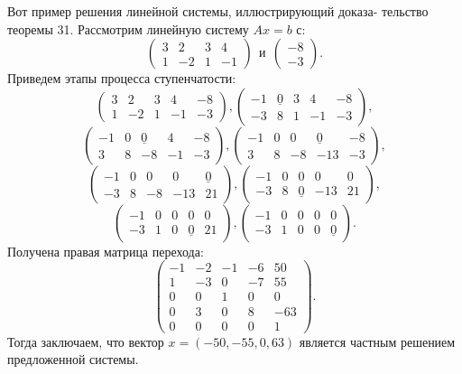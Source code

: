 	Вот пример решения линейной системы, иллюстрирующий доказа-\linebreak
	тельство теоремы 31. Рассмотрим линейную систему $Ax = b$ с:\linebreak
	$$\begin{pmatrix} 3 & 2 & 3 & 4 \\ 1 & -2 & 1 & -1 \end{pmatrix} \ \ \text{и} \ \ \begin{pmatrix} -8 \\ -3 \end{pmatrix}.$$
	Приведем этапы процесса ступенчатости:
	$$\begin{pmatrix} 3 & 2 & 3 & 4 & -8 \\ 1 & -2 & 1 & -1 & -3 \end{pmatrix}, \begin{pmatrix} -1 & \underline{0} & 3 & 4 & -8 \\ -3 & 8 & 1 & -1 & -3 \end{pmatrix},$$
	$$\begin{pmatrix} -1 & 0 & \underline{0} & 4 & -8 \\ 3 & 8 & -8 & -1 & -3 \end{pmatrix}, \begin{pmatrix} -1 & 0 & 0 & \underline{0} & -8 \\ 3 & 8 & -8 & -13 & -3 \end{pmatrix},$$
	$$\begin{pmatrix} -1 & 0 & 0 & 0 & \underline{0} \\ -3 & 8 & -8 & -13 & 21 \end{pmatrix}, \begin{pmatrix} -1 & 0 & 0 & 0 & 0 \\ -3 & 8 & \underline{0} & -13 & 21 \end{pmatrix},$$
	$$\begin{pmatrix} -1 & 0 & 0 & 0 & 0 \\ -3 & 1 & 0 & \underline{0} & 21 \end{pmatrix}, \begin{pmatrix} -1 & 0 & 0 & 0 & 0 \\ -3 & 1 & 0 & 0 & \underline{0} \end{pmatrix}.$$
	Получена правая матрица перехода:
	$$\begin{pmatrix} -1 & -2 & -1 & -6 & 50 \\ 1 & -3 & 0 & -7 & 55 \\ 0 & 0 & 1 & 0 & 0 \\ 0 & 3 & 0 & 8 & -63 \\ 0 & 0 & 0 & 0 & 1\end{pmatrix}.$$
	Тогда заключаем, что вектор $x = (-50, -55, 0, 63)$ является частным\linebreak
	решением предложенной системы. 
	
